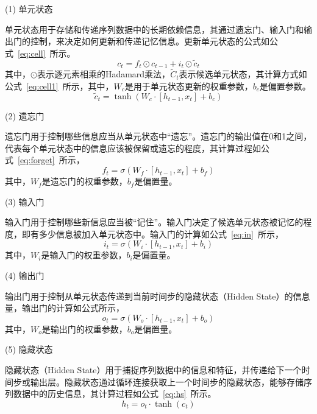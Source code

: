 (1) 单元状态

单元状态用于存储和传递序列数据中的长期依赖信息，其通过遗忘门、输入门和输出门的控制，来决定如何更新和传递记忆信息。更新单元状态的公式如公式~\ref{eq:cell}~所示。
\begin{equation}
    c_t = f_t \odot c_{t-1} + i_t \odot \tilde{c}_t
    \label{eq:cell}
\end{equation}
其中，\(\odot\)表示逐元素相乘的Hadamard乘法，\(\tilde{C}_t\)表示候选单元状态，其计算方式如公式~\ref{eq:cell1}~所示，其中，\(W_c\)是用于单元状态更新的权重参数，\(b_c\)是偏置参数。
\begin{equation}
    \tilde{c}_t = \tanh(W_c \cdot [h_{t-1}, x_t] + b_c)
    \label{eq:cell1}
\end{equation}

(2) 遗忘门

遗忘门用于控制哪些信息应当从单元状态中“遗忘”。遗忘门的输出值在0和1之间，代表每个单元状态中的信息应该被保留或遗忘的程度，其计算过程如公式~\ref{eq:forget}~所示，
\begin{equation}
    f_t = \sigma(W_f \cdot [h_{t-1}, x_t] + b_f)
    \label{eq:forget}
\end{equation}
其中，\(W_f\)是遗忘门的权重参数，\(b_f\)是偏置量。

(3) 输入门

输入门用于控制哪些新信息应当被“记住”。输入门决定了候选单元状态被记忆的程度，即有多少信息被加入单元状态中。输入门的计算如公式~\ref{eq:in}~所示，
\begin{equation}
    i_t = \sigma(W_i \cdot [h_{t-1}, x_t] + b_i)
    \label{eq:in}
\end{equation}
其中，\(W_i\)是输入门的权重参数，\(b_i\)是偏置量。

(4) 输出门

输出门用于控制从单元状态传递到当前时间步的隐藏状态（Hidden State）的信息量，输出门的计算如公式所示，
\begin{equation}
    o_t = \sigma(W_o \cdot [h_{t-1}, x_t] + b_o)
    \label{eq:out}
\end{equation}
其中，\(W_o\)是输出门的权重参数，\(b_o\)是偏置量。

(5) 隐藏状态

隐藏状态（Hidden State）用于捕捉序列数据中的信息和特征，并传递给下一个时间步或输出层。隐藏状态通过循环连接获取上一个时间步的隐藏状态，能够存储序列数据中的历史信息，其计算过程如公式~\ref{eq:hs}~所示。
\begin{equation}
    h_t = o_t \cdot \tanh(c_t)
    \label{eq:hs}
\end{equation}

